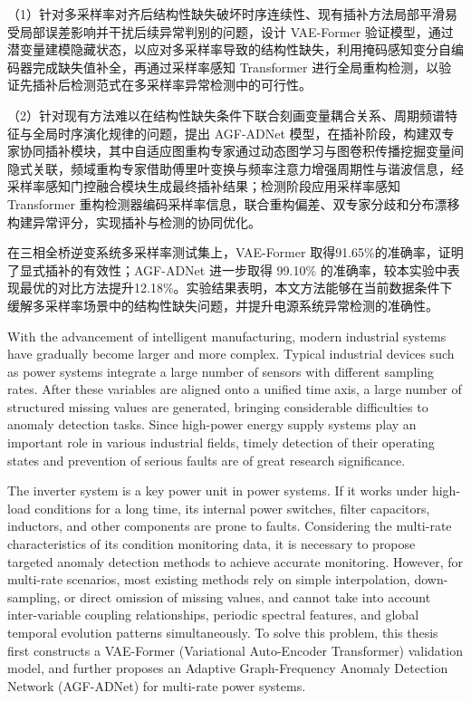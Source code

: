 \documentclass[bachelor, vlined]{DissertUESTC}
\begin{document}
    （1）针对多采样率对齐后结构性缺失破坏时序连续性、现有插补方法局部平滑易受局部误差影响并干扰后续异常判别的问题，设计 VAE-Former 验证模型，通过潜变量建模隐藏状态，以应对多采样率导致的结构性缺失，利用掩码感知变分自编码器完成缺失值补全，再通过采样率感知 Transformer 进行全局重构检测，以验证先插补后检测范式在多采样率异常检测中的可行性。

    （2）针对现有方法难以在结构性缺失条件下联合刻画变量耦合关系、周期频谱特征与全局时序演化规律的问题，提出 AGF-ADNet 模型，在插补阶段，构建双专家协同插补模块，其中自适应图重构专家通过动态图学习与图卷积传播挖掘变量间隐式关联，频域重构专家借助傅里叶变换与频率注意力增强周期性与谐波信息，经采样率感知门控融合模块生成最终插补结果；检测阶段应用采样率感知 Transformer 重构检测器编码采样率信息，联合重构偏差、双专家分歧和分布漂移构建异常评分，实现插补与检测的协同优化。

    在三相全桥逆变系统多采样率测试集上，VAE-Former 取得91.65\%的准确率，证明了显式插补的有效性；AGF-ADNet 进一步取得 99.10\% 的准确率，较本实验中表现最优的对比方法提升12.18\%。实验结果表明，本文方法能够在当前数据条件下缓解多采样率场景中的结构性缺失问题，并提升电源系统异常检测的准确性。


	\enabstract
	With the advancement of intelligent manufacturing, modern industrial systems have gradually become larger and more complex. Typical industrial devices such as power systems integrate a large number of sensors with different sampling rates. After these variables are aligned onto a unified time axis, a large number of structured missing values are generated, bringing considerable difficulties to anomaly detection tasks. Since high-power energy supply systems play an important role in various industrial fields, timely detection of their operating states and prevention of serious faults are of great research significance.

	The inverter system is a key power unit in power systems. If it works under high-load conditions for a long time, its internal power switches, filter capacitors, inductors, and other components are prone to faults. Considering the multi-rate characteristics of its condition monitoring data, it is necessary to propose targeted anomaly detection methods to achieve accurate monitoring. However, for multi-rate scenarios, most existing methods rely on simple interpolation, down-sampling, or direct omission of missing values, and cannot take into account inter-variable coupling relationships, periodic spectral features, and global temporal evolution patterns simultaneously. To solve this problem, this thesis first constructs a VAE-Former (Variational Auto-Encoder Transformer) validation model, and further proposes an Adaptive Graph-Frequency Anomaly Detection Network (AGF-ADNet) for multi-rate power systems.
\end{document}

